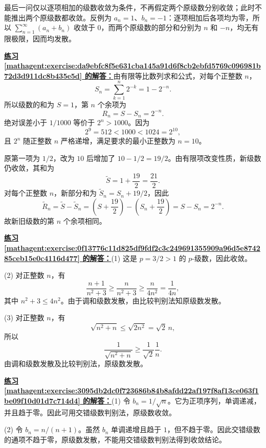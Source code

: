 \documentclass[UTF8,fontset=fandol,11pt]{ctexart}
\begin{document}
最后一问仅以逐项相加的级数收敛为条件，不再假定两个原级数分别收敛；此时不能推出两个原级数都收敛。反例为 $a_n=1$、$b_n=-1$：逐项相加后各项均为零，所以 $\sum_{n=1}^{\infty}(a_n+b_n)$ 收敛于 $0$，而两个原级数的部分和分别为 $n$ 和 $-n$，均无有限极限，因而均发散。\par
\par\noindent\textbf{\hyperref[mathagent:exercise:da9ebfc8f5e631cba145a91d6f8cb2ebfd5769c096981b72d3d911dc8b435e5d]{练习 \ref*{mathagent:exercise:da9ebfc8f5e631cba145a91d6f8cb2ebfd5769c096981b72d3d911dc8b435e5d} 的解答：}}由有限等比数列求和公式，对每个正整数 $n$，
\[
S_n=\sum_{k=1}^{n}2^{-k}=1-2^{-n}.
\]
所以级数的和为 $S=1$，第 $n$ 个余项为
\[
R_n=S-S_n=2^{-n}.
\]
绝对误差小于 $1/1000$ 等价于 $2^n>1000$。因为
\[
2^9=512<1000<1024=2^{10},
\]
且 $2^n$ 随正整数 $n$ 严格递增，满足要求的最小正整数为 $n=10$。

原第一项为 $1/2$，改为 $10$ 后增加了 $10-1/2=19/2$。由有限项改变性质，新级数仍收敛，其和为
\[
\widetilde S=1+\frac{19}{2}=\frac{21}{2}.
\]
对每个正整数 $n$，新部分和为 $\widetilde S_n=S_n+19/2$，因此
\[
\widetilde R_n=\widetilde S-\widetilde S_n
=\left(S+\frac{19}{2}\right)-\left(S_n+\frac{19}{2}\right)
=S-S_n=2^{-n}.
\]
故新旧级数的第 $n$ 个余项相同。\par
\par\noindent\textbf{\hyperref[mathagent:exercise:0f13776c11d825df9fdf2c3c249691355909a96d5e874285ceb15e0c4116d477]{练习 \ref*{mathagent:exercise:0f13776c11d825df9fdf2c3c249691355909a96d5e874285ceb15e0c4116d477} 的解答：}}(1) 这是 $p=3/2>1$ 的 $p$-级数，因此收敛。

(2) 对正整数 $n$，有
\[
\frac{n+1}{n^2+3}\geq\frac{n}{n^2+3}\geq\frac{n}{4n^2}=\frac{1}{4n},
\]
其中 $n^2+3\leq4n^2$。由于调和级数发散，由比较判别法知原级数发散。

(3) 对正整数 $n$，有
\[
\sqrt{n^2+n}\leq\sqrt{2n^2}=\sqrt{2}\,n,
\]
所以
\[
\frac{1}{\sqrt{n^2+n}}\geq\frac{1}{\sqrt{2}}\frac{1}{n}.
\]
由调和级数发散及比较判别法，原级数发散。\par
\par\noindent\textbf{\hyperref[mathagent:exercise:3095db2dc0f723686b84b8afdd22af197f8af13ce063f1be09f10d01d7c714d4]{练习 \ref*{mathagent:exercise:3095db2dc0f723686b84b8afdd22af197f8af13ce063f1be09f10d01d7c714d4} 的解答：}}(1) 令 $b_n=1/\sqrt n$。它为正项序列，单调递减，并且趋于零。因此可用交错级数判别法，原级数收敛。

(2) 令 $b_n=n/(n+1)$。虽然 $b_n$ 单调递增且趋于 $1$，但不趋于零。因此交错级数的通项不趋于零，原级数发散，不能用交错级数判别法得到收敛结论。
\end{document}
